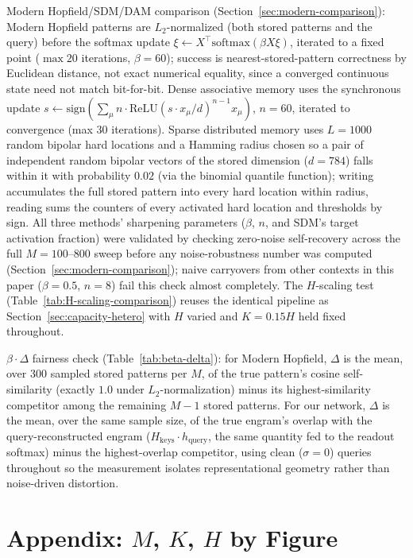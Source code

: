 \documentclass[11pt]{article}
\begin{document}
Modern Hopfield/SDM/DAM comparison (Section~\ref{sec:modern-comparison}): Modern Hopfield
patterns are $L_2$-normalized (both stored patterns and the query) before the softmax update
$\xi\leftarrow X^\top\mathrm{softmax}(\beta X\xi)$, iterated to a fixed point ($\max20$
iterations, $\beta{=}60$); success is nearest-stored-pattern correctness by Euclidean distance,
not exact numerical equality, since a converged continuous state need not match bit-for-bit.
Dense associative memory uses the synchronous update $s\leftarrow\mathrm{sign}(\sum_\mu n\cdot
\mathrm{ReLU}(s\cdot x_\mu/d)^{n-1}x_\mu)$, $n{=}60$, iterated to convergence (max $30$
iterations). Sparse distributed memory uses $L{=}1000$ random bipolar hard locations and a
Hamming radius chosen so a pair of independent random bipolar vectors of the stored dimension
($d{=}784$) falls within it with probability $0.02$ (via the binomial quantile function);
writing accumulates the full stored pattern into every hard location within radius, reading
sums the counters of every activated hard location and thresholds by sign. All three methods'
sharpening parameters ($\beta$, $n$, and SDM's target activation fraction) were validated by
checking zero-noise self-recovery across the full $M{=}100$--$800$ sweep before any
noise-robustness number was computed (Section~\ref{sec:modern-comparison}); naive carryovers
from other contexts in this paper ($\beta{=}0.5$, $n{=}8$) fail this check almost completely.
The $H$-scaling test (Table~\ref{tab:H-scaling-comparison}) reuses the identical pipeline as
Section~\ref{sec:capacity-hetero} with $H$ varied and $K{=}0.15H$ held fixed throughout.

$\beta\cdot\Delta$ fairness check (Table~\ref{tab:beta-delta}): for Modern Hopfield, $\Delta$ is
the mean, over $300$ sampled stored patterns per $M$, of the true pattern's cosine self-similarity
(exactly $1.0$ under $L_2$-normalization) minus its highest-similarity competitor among the
remaining $M{-}1$ stored patterns. For our network, $\Delta$ is the mean, over the same sample
size, of the true engram's overlap with the query-reconstructed engram ($H_{\mathrm{keys}}\cdot
h_{\mathrm{query}}$, the same quantity fed to the readout softmax) minus the highest-overlap
competitor, using clean ($\sigma{=}0$) queries throughout so the measurement isolates
representational geometry rather than noise-driven distortion.

\section*{Appendix: $M$, $K$, $H$ by Figure}
\label{sec:appendix-mkh}
\end{document}
